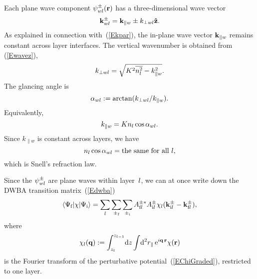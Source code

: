 Each plane wave component $\psi^\pm_{wl}(\mathbf{r})$ has
a three-dimensional wave vector
\begin{equation}\label{Ekpmwj3}
  \mathbf{k}^\pm_{wl}= \mathbf{k}_{\parallel w} \pm k_{\perp wl}\mathbf{\hat z}.
\end{equation}
%
%
As explained in connection with~(\ref{Ekpar}),
the in-plane wave vector $\mathbf{k}_{\parallel w}$ remains constant
across layer interfaces.
The vertical wavenumber is obtained from (\ref{Ewavez}),
\begin{equation}\label{Ekperpwj}
  k_{\perp wl} = \sqrt{K^2 \overline{n_l^2} - k_{\parallel w}^2}.
\end{equation}
The glancing angle is
\begin{equation}\label{Edef_alpha}
  \alpha_{wl}:=\arctan(k_{\perp wl}/k_{\parallel w}).  
\end{equation}
Equivalently,
\begin{equation}
  k_{\parallel w}=K n_l \cos\alpha_{wl}. 
\end{equation}
Since $k_{\parallel w}$ is constant across layers,
we have
\begin{equation}\label{ESnell}
  n_l \cos\alpha_{wl} = \text{the same for all }l,
\end{equation}
which is Snell's refraction law.

Since the $\psi^\pm_{wl}$ are plane waves within layer~$l$,
we can at once write down the DWBA transition matrix~(\ref{Edwba})
%
\begin{equation}\label{Edwba_ml0}
  \left\langle \Psi_{\text{f}}|\chi|\Psi_{\text{i}}\right\rangle
  = \sum_{l} \sum_{\pm_{\text{f}}} \sum_{\pm_{\text{i}}}
    A^{\pm *}_{\text{f} l} A^\pm_{\text{i} l} 
     \chi_l(\mathbf{k}^\pm_{\text{i} l}-\mathbf{k}^\pm_{\text{f} l}),
\end{equation}
where
\begin{equation}\label{Echij}
  \chi_l(\mathbf{q})
  := \int_{z_l}^{z_{l-1}}\!\text{d} z \int\!\text{d}^2r_\parallel\, \text{e}^{i\mathbf{q}\,\mathbf{r}}\chi(\mathbf{r})
\end{equation}
%
is the Fourier transform
of the perturbative potential~(\ref{EChiGraded}),
restricted to one layer.

